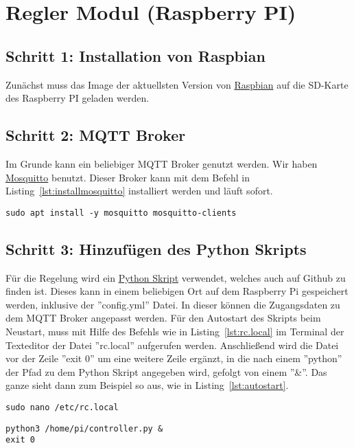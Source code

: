 \section{Regler Modul (Raspberry PI)}

\subsection{Schritt 1: Installation von Raspbian}
Zunächst muss das Image der aktuellsten Version von \href{https://www.raspberrypi.org/downloads/raspbian/}{Raspbian} auf die SD-Karte des Raspberry PI geladen werden.

\subsection{Schritt 2: MQTT Broker}
Im Grunde kann ein beliebiger MQTT Broker genutzt werden. Wir haben \href{http://mosquitto.org/}{Mosquitto} benutzt. Dieser Broker kann mit dem Befehl in Listing~\ref{lst:installmosquitto} installiert werden und läuft sofort.

\begin{lstlisting}
sudo apt install -y mosquitto mosquitto-clients
\end{lstlisting}

\subsection{Schritt 3: Hinzufügen des Python Skripts}
Für die Regelung wird ein \href{https://github.com/maxbachmann-university/blind-controller}{Python Skript} verwendet, welches auch auf Github zu finden ist. Dieses kann in einem beliebigen Ort auf dem Raspberry Pi gespeichert werden, inklusive der ''config.yml'' Datei. In dieser können die Zugangsdaten zu dem MQTT Broker angepasst werden. Für den Autostart des Skripts beim Neustart, muss mit Hilfe des Befehls wie in Listing~\ref{lst:rc.local} im Terminal der Texteditor der Datei ''rc.local'' aufgerufen werden. Anschließend wird die Datei vor der Zeile ''exit 0'' um eine weitere Zeile ergänzt, in die nach einem ''python'' der Pfad zu dem Python Skript angegeben wird, gefolgt von einem ''\&''. Das ganze sieht dann zum Beispiel so aus, wie in Listing~\ref{lst:autostart}.

\begin{lstlisting}
sudo nano /etc/rc.local
\end{lstlisting}

\lstset{language=Python}
\begin{lstlisting}
python3 /home/pi/controller.py &
exit 0
\end{lstlisting}